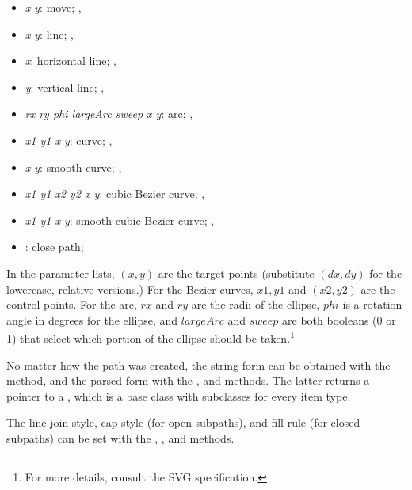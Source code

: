 \begin{itemize}
\item {} \textit{x y}: move; , 
\item {} \textit{x y}: line; , 
\item {} \textit{x}: horizontal line; , 
\item {} \textit{y}: vertical line; , 
\item {} \textit{rx ry phi largeArc sweep x y}: arc; , 
\item {} \textit{x1 y1 x y}: curve; , 
\item {} \textit{x y}: smooth curve; , 
\item {} \textit{x1 y1 x2 y2 x y}: cubic Bezier curve; , 
\item {} \textit{x1 y1 x y}: smooth cubic Bezier curve; , 
\item {}: close path; 
\end{itemize}

In the parameter lists, $(x,y)$ are the target points (substitute $(dx,dy)$ for
the lowercase, relative versions.) For the Bezier curves, $x1,y1$ and
$(x2,y2)$ are the control points. For the arc, $rx$ and $ry$ are the radii of the
ellipse, $phi$ is a rotation angle in degrees for the ellipse, and
$largeArc$ and $sweep$ are both booleans (0 or 1) that select which portion
of the ellipse should be taken.\footnote{For more details, consult the SVG
specification.}

No matter how the path was created, the string form can be obtained with the
 method, and the parsed form with the ,
and  methods. The latter returns a pointer to a
, which is a base class with subclasses for every
item type.

The line join style, cap style (for open subpaths), and fill rule (for closed
subpaths) can be set with the ,
, and  methods.

